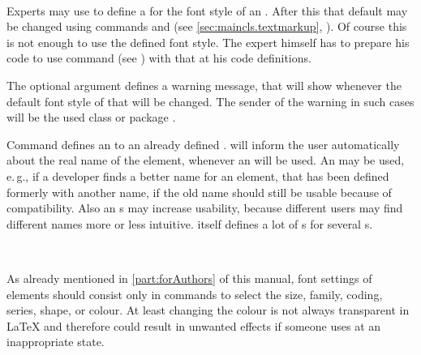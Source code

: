 \begin{Declaration}
                     \\
\end{Declaration}
%
%
Experts may use  to define a  for the font
style of an . After this that default may be changed using
commands  and  (see
\autoref{sec:maincls.textmarkup},
). Of course this is not enough to
use the defined font style. The expert himself has to prepare his code to use
command
 (see
) with that  at his
code definitions.

The optional argument  defines a warning message,
that \KOMAScript{} will show whenever the default font style of that
 will be changed. The sender of the warning in such cases will
be the used \KOMAScript{} class or package .

Command  defines an  to an already
defined . \KOMAScript{} will inform the user automatically
about the real name of the element, whenever an  will be
used. An  may be used, e.\,g., if a
developer finds a better name for an element, that has been defined formerly
with another name, if the old name should still be usable because of
compatibility. Also an s may increase usability, because
different users may find different names more or less intuitive. \KOMAScript{}
itself defines a lot of s for several s.
%
%
%

\begin{Declaration}
  \\
\end{Declaration}
%
%
As already mentioned in \autoref{part:forAuthors} of this manual, font
settings of elements should consist only in commands to select the size, family,
coding, series, shape, or colour. At least changing the colour is not always
transparent in \LaTeX{} and therefore could result in unwanted effects if
someone uses  at an inappropriate state.

